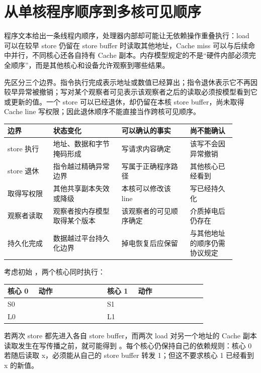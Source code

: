 \section{从单核程序顺序到多核可见顺序}

程序文本给出一条线程内顺序，处理器内部却可能让无依赖操作重叠执行：load 可以在较早 store 仍留在 store buffer 时读取其他地址，Cache miss 可以与后续命中并行，不同核心还各自持有 Cache 副本。内存模型规定的不是“硬件内部必须完全顺序”，而是其他核心和设备允许观察到哪些结果。

先区分三个边界。指令执行完成表示地址或数值已经算出；指令退休表示它不再因较早异常被撤销；写对某个观察者可见表示该观察者之后的读取必须按模型看到它或更新的值。一个 store 可以已经退休，却仍留在本核 store buffer，尚未取得 Cache line 写权限；因此退休顺序不能直接当作跨核可见顺序。

\begin{longtable}{L{0.18\linewidth}L{0.27\linewidth}L{0.27\linewidth}L{0.18\linewidth}}
\toprule
边界 & 状态变化 & 可以确认的事实 & 尚不能确认 \\
\midrule
store 执行 & 地址、数据和字节掩码形成 & 写请求内容确定 & 该写不会因异常撤销 \\
store 退休 & 指令越过精确异常边界 & 写属于正确程序路径 & 其他核心已经看到 \\
取得写权限 & 其他共享副本失效或降级 & 本核可以修改该 line & 写已经持久化 \\
观察者读取 & 观察者按内存模型取得某个版本 & 该观察者的可见顺序确定 & 介质掉电后仍存在 \\
持久化完成 & 数据越过平台持久化边界 & 掉电恢复后应保留 & 与其他地址的顺序仍需协议规定 \\
\bottomrule
\end{longtable}


考虑初始 ，两个核心同时执行：

\begin{longtable}{L{0.14\linewidth}L{0.31\linewidth}L{0.14\linewidth}L{0.31\linewidth}}
\toprule
核心 0 & 动作 & 核心 1 & 动作 \\
\midrule
S0 &  & S1 &  \\
L0 &  & L1 &  \\
\bottomrule
\end{longtable}

若两次 store 都先进入各自 store buffer，而两次 load 对另一个地址的 Cache 副本读取发生在写传播之前，就可能得到 。每个核心仍保持自己的依赖规则：核心 0 若随后读取 x，必须能从自己的 store buffer 转发 1；但这不要求核心 1 已经看到 x 的新值。

